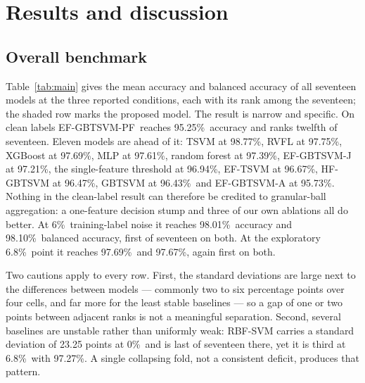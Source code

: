 \documentclass[final,5p,times,twocolumn]{elsarticle}
\newcommand{\proposed}{EF-GBTSVM-PF}
\newcommand{\nz}{\%}
\begin{document}
\section{Results and discussion}\label{sec:results}
\subsection{Overall benchmark}
Table~\ref{tab:main} gives the mean accuracy and balanced accuracy of all seventeen models at the three reported conditions, each with its rank among the seventeen; the shaded row marks the proposed model. The result is narrow and specific. On clean labels \proposed\ reaches 95.25\nz\ accuracy and ranks twelfth of seventeen. Eleven models are ahead of it: TSVM at 98.77\nz, RVFL at 97.75\nz, XGBoost at 97.69\nz, MLP at 97.61\nz, random forest at 97.39\nz, EF-GBTSVM-J at 97.21\nz, the single-feature threshold at 96.94\nz, EF-TSVM at 96.67\nz, HF-GBTSVM at 96.47\nz, GBTSVM at 96.43\nz\ and EF-GBTSVM-A at 95.73\nz. Nothing in the clean-label result can therefore be credited to granular-ball aggregation: a one-feature decision stump and three of our own ablations all do better. At 6\nz\ training-label noise it reaches 98.01\nz\ accuracy and 98.10\nz\ balanced accuracy, first of seventeen on both. At the exploratory 6.8\nz\ point it reaches 97.69\nz\ and 97.67\nz, again first on both.
\begin{table}[!t]\centering\scriptsize\setlength{\tabcolsep}{5.5pt}
\caption{Mean test accuracy and balanced accuracy (\%) $\pm$ standard deviation over the four held-out cells, with the rank among the seventeen models in parentheses (1 = best). All seventeen models are shown; shading marks the proposed selector, and $^{\dagger}$ marks the two candidate variants from which it is assembled. The 6.8\nz\ condition was chosen after the 6\nz\ result and is exploratory.}\label{tab:main}
\end{table}

Two cautions apply to every row. First, the standard deviations are large next to the differences between models --- commonly two to six percentage points over four cells, and far more for the least stable baselines --- so a gap of one or two points between adjacent ranks is not a meaningful separation. Second, several baselines are unstable rather than uniformly weak: RBF-SVM carries a standard deviation of 23.25 points at 0\nz\ and is last of seventeen there, yet it is third at 6.8\nz\ with 97.27\nz. A single collapsing fold, not a consistent deficit, produces that pattern.
\end{document}
